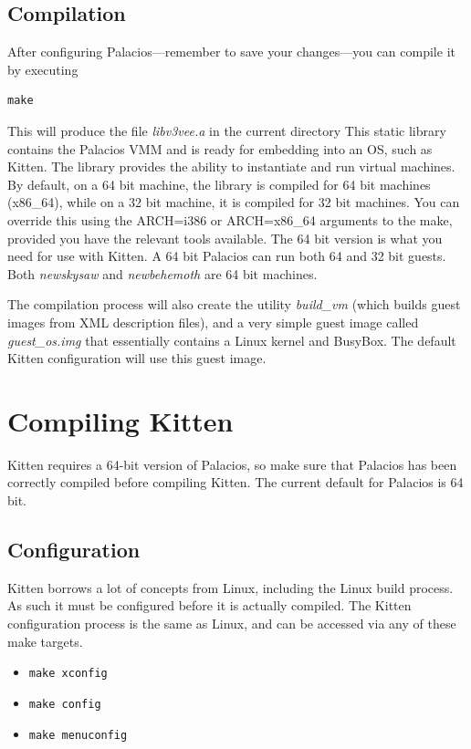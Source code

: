 \documentclass[11pt]{article}
\begin{document}
\subsection{Compilation}

After configuring Palacios---remember to save your changes---you can
compile it by executing
\begin{verbatim}
make 
\end{verbatim}
This will produce the file {\em libv3vee.a} in the current directory
This static library contains the Palacios VMM and is ready for
embedding into an OS, such as Kitten.  The library provides the
ability to instantiate and run virtual machines.  By default, on a 64
bit machine, the library is compiled for 64 bit machines (x86\_64),
while on a 32 bit machine, it is compiled for 32 bit machines.  You
can override this using the ARCH=i386 or ARCH=x86\_64 arguments to the
make, provided you have the relevant tools available.  The 64 bit
version is what you need for use with Kitten.  A 64 bit Palacios can
run both 64 and 32 bit guests.  Both {\em newskysaw} and {\em
newbehemoth} are 64 bit machines. 

The compilation process will also create the utility {\em build\_vm}
(which builds guest images from XML description files), and a very
simple guest image called {\em guest\_os.img} that essentially contains
a Linux kernel and BusyBox.  The default Kitten configuration will use
this guest image.


\section{Compiling Kitten}
Kitten requires a 64-bit version of Palacios, so make sure that
Palacios has been correctly compiled before compiling Kitten.  The
current default for Palacios is 64 bit. 

\subsection{Configuration}
Kitten borrows a lot of concepts from Linux, including the Linux build
process. As such it must be configured before it is actually compiled.
The Kitten configuration process is the same as Linux, and can be
accessed via any of these make targets.
\begin{itemize}
\item \verb.make xconfig.
\item \verb.make config.
\item \verb.make menuconfig.
\end{itemize}
\end{document}
